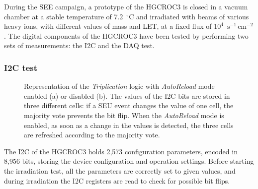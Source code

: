 \bigbreak

During the SEE campaign, a prototype of the HGCROC3 is closed in a vacuum chamber at a stable temperature of 7.2~$^{\circ}$C and irradiated with beams of various heavy ions, with different values of mass and LET, at a fixed flux of $10^4$~$\textrm{s}^{-1}\,\textrm{cm}^{-2}$. 
The digital components of the HGCROC3 have been tested by performing two sets of measurements: the I2C and the DAQ test.

\subsubsection{I2C test}

\begin{figure}
    \centering
    \hspace{1.cm}
    \caption{Representation of the \textit{Triplication} logic with \textit{AutoReload} mode enabled (a) or disabled (b). The values of the I2C bits are stored in three different cells: if a SEU event changes the value of one cell, the majority vote prevents the bit flip. When the \textit{AutoReload} mode is enabled, as soon as a change in the values is detected, the three cells are refreshed according to the majority vote.}
    \label{fig:Autoreload}
\end{figure}

The I2C of the HGCROC3 holds 2,573 configuration parameters, encoded in 8,956 bits, storing the device configuration and operation settings. 
Before starting the irradiation test, all the parameters are correctly set to given values, and during irradiation the I2C registers are read to check for possible bit flips.

